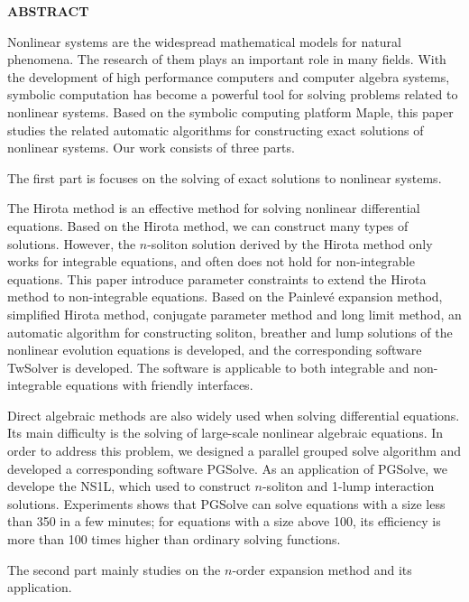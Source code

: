 {}
\centerline{\bfseries ABSTRACT}

\linespread{1.4}
\bigskip

Nonlinear systems are the widespread mathematical models for natural phenomena. The research of them plays an important role in many fields. With the development of high performance computers and computer algebra systems, symbolic computation has become a powerful tool for solving problems related to nonlinear systems. Based on the symbolic computing platform Maple, this paper studies the related automatic algorithms for constructing exact solutions of nonlinear systems. Our work consists of three parts.

The first part is focuses on the solving of exact solutions to nonlinear systems.

The Hirota method is an effective method for solving nonlinear differential equations. Based on the Hirota method, we can construct many types of solutions. However, the $n$-soliton solution derived by the Hirota method  only works for integrable equations, and often does not hold for non-integrable equations. This paper introduce parameter constraints to extend the Hirota method to  non-integrable equations. Based on the Painlevé expansion method, simplified Hirota method, conjugate parameter method and long limit method, an automatic algorithm for constructing soliton, breather and lump solutions of the nonlinear evolution equations is developed, and the corresponding software TwSolver is developed. The software is applicable to both integrable and non-integrable equations with friendly interfaces. 

Direct algebraic methods are also widely used when solving differential equations. Its main difficulty is the solving of large-scale nonlinear algebraic equations. In order to address this problem, we designed a parallel grouped solve algorithm and developed a corresponding software PGSolve. As an application of PGSolve, we develope  the NS1L,  which used to construct $n$-soliton and 1-lump interaction solutions. Experiments shows that PGSolve can solve equations with a size less than 350 in a few minutes; for equations with a size above 100, its efficiency is more than 100 times higher than ordinary solving functions.

The second part mainly studies on the $n$-order expansion method and its application.


